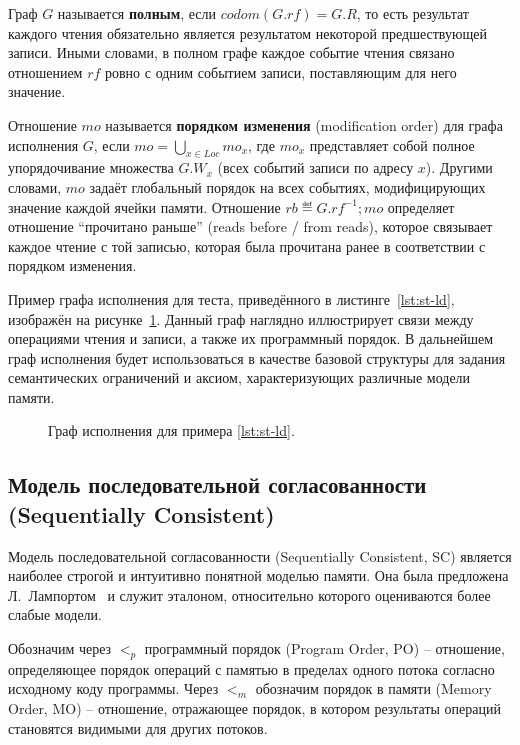 Граф $G$ называется \textbf{полным}, если $codom(G.rf) = G.R$, то
есть результат каждого чтения обязательно является результатом
некоторой предшествующей записи. Иными словами, в полном графе каждое
событие чтения связано отношением $rf$ ровно с одним событием записи,
поставляющим для него значение.

Отношение $mo$ называется \textbf{порядком изменения} (modification
order) для графа исполнения $G$, если $mo = \bigcup_{x \in
Loc}mo_{x}$, где $mo_{x}$ представляет собой полное упорядочивание
множества $G.W_{x}$ (всех событий записи по адресу $x$). Другими
словами, $mo$ задаёт глобальный порядок на всех событиях,
модифицирующих значение каждой ячейки памяти. Отношение $rb \eqdef
G.rf^{-1};mo$ определяет отношение ``прочитано раньше'' (reads before
/ from reads), которое связывает каждое чтение с той записью, которая
была прочитана ранее в соответствии с порядком изменения.

Пример графа исполнения для теста, приведённого в
листинге~\ref{lst:st-ld}, изображён на рисунке~\ref{fig:exec_graph}.
Данный граф наглядно иллюстрирует связи между операциями чтения и
записи, а также их программный порядок. В дальнейшем граф исполнения
будет использоваться в качестве базовой структуры для задания
семантических ограничений и аксиом, характеризующих различные модели памяти.

\begin{figure}[htbp]
  \centerfloat{
    
  }
  \caption{Граф исполнения для примера \ref{lst:st-ld}.}
  \label{fig:exec_graph}
\end{figure}

\subsection{Модель последовательной согласованности (Sequentially Consistent)}
\label{sec:SC}

Модель последовательной согласованности (Sequentially Consistent, SC)
является наиболее строгой и интуитивно понятной моделью памяти. Она
была предложена Л.~Лампортом~\cite{LAMPORT} и служит эталоном,
относительно которого оцениваются более слабые модели.

Обозначим через $<_{p}$ программный порядок (Program Order, PO) --
отношение, определяющее порядок операций с памятью в пределах одного
потока согласно исходному коду программы. Через $<_{m}$ обозначим
порядок в памяти (Memory Order, MO) -- отношение, отражающее порядок,
в котором результаты операций становятся видимыми для других потоков.

